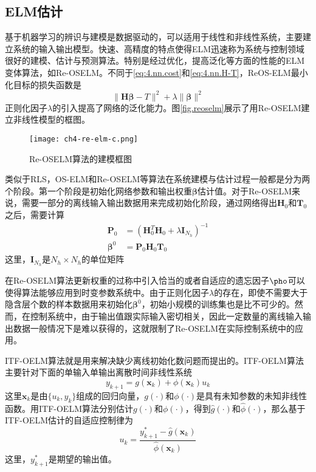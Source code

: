 \subsection{ELM估计}
基于机器学习的辨识与建模是数据驱动的，可以适用于线性和非线性系统，主要建立系统的输入输出模型。快速、高精度的特点使得ELM迅速称为系统与控制领域很好的建模、估计与预测算法。特别是经过优化，提高泛化等方面的性能的ELM变体算法，如Re-OSELM。不同于\eqref{eq:4.nn.cost}和\eqref{eq:4.nn.H-T}，ReOS-ELM最小化目标的损失函数是
\begin{equation}\label{eq:4.re.cost}
\|\bm{H}\bm{\beta}-T\|^{2}+\lambda\|\bm{\beta}\|^{2}
\end{equation}
正则化因子$\lambda$的引入提高了网络的泛化能力。图\eqref{fig.reoselm}展示了用Re-OSELM建立非线性模型的框图。

\begin{figure}[!htb]
  \centering
  \texttt{[image: ch4-re-elm-c.png]}\\	 %
  \caption{Re-OSELM算法的建模框图}
  \label{fig.reoselm}
\end{figure}

类似于RLS，OS-ELM和Re-OSELM等算法在系统建模与估计过程一般都是分为两个阶段。第一个阶段是初始化网络参数和输出权重$\bm{\beta}$估计值。对于Re-OSELM来说，需要一部分的离线输入输出数据用来完成初始化阶段，通过网络得出$\bm{H}_{0}$和$\bm{T}_{0}$之后，需要计算
\begin{equation}
\begin{split}%
\bm{P}_{0}&=(\bm{H}_{0}^{T}\bm{H}_{0}+\lambda \bm{I}_{N_{h}})^{-1}\\
\bm{\beta}^{0}&=\bm{P}_{0}\bm{H}_{0}\bm{T}_{0}
\end{split}
\end{equation}
这里，$\bm{I}_{N_{h}}$是$N_{h}\times N_{h}$的单位矩阵

在Re-OSELM算法更新权重的过称中引入恰当的或者自适应的遗忘因子$\pho$可以使得算法能够应用到时变参数系统中。由于正则化因子$\lambda$的存在，即使不需要大于隐含层个数的样本数据用来初始化$\bm{\beta}^{0}$，初始小规模的训练集也是比不可少的。然而，在控制系统中，由于输出值跟实际输入密切相关，因此一定数量的离线输入输出数据一般情况下是难以获得的，这就限制了Re-OSELM在实际控制系统中的应用。

ITF-OELM算法就是用来解决缺少离线初始化数问题而提出的。ITF-OELM算法主要针对下面的单输入单输出离散时间非线性系统
\begin{equation}\label{eq:4.siso}
y_{k+1} = g(\bm{x}_{k})+\phi(\bm{x}_{k})u_{k}
\end{equation}
这里$\bm{x}_{k}$是由$\{u_{k},y_{k}\}$组成的回归向量，$g(\cdot)$和$\phi(\cdot)$是具有未知参数的未知非线性函数。用ITF-OELM算法分别估计$g(\cdot)$和$\phi(\cdot)$，得到$\hat{g}(\cdot)$和$\hat{\phi}(\cdot)$，那么基于ITF-OELM估计的自适应控制律为
\begin{equation}\label{eq:4.itf.u}
u_{k}=\frac{y_{k+1}^{*}-\hat{g}(\bm{x}_{k})}{\hat{\phi}(\bm{x}_{k})} 
\end{equation}
这里，$y_{k+1}^{*}$是期望的输出值。

